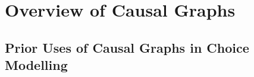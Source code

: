 \section{Overview of Causal Graphs}
\label{sec:graph-overview}


\subsection{Prior Uses of Causal Graphs in Choice Modelling}
\label{sec:choice-graphs}
